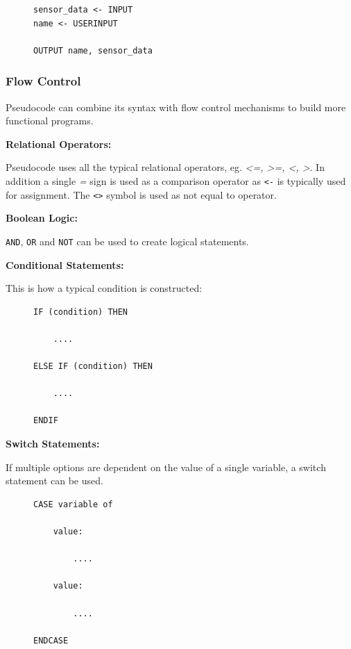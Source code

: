 \documentclass[9pt]{article}
\begin{document}
\begin{figure}[H]
\begin{verbatim}
sensor_data <- INPUT
name <- USERINPUT

OUTPUT name, sensor_data
\end{verbatim}
\end{figure}

\subsubsection{Flow Control}
\label{sec:org4c26a6b}

Pseudocode can combine its syntax with flow control mechanisms to build more functional programs.

\textbf{Relational Operators:}

Pseudocode uses all the typical relational operators, eg. \emph{<=, >=, <, >}. In addition a single \emph{=} sign is used as a comparison operator as \texttt{<-} is typically used for assignment. The \texttt{<>} symbol is used as not equal to operator.

\textbf{Boolean Logic:}

\texttt{AND}, \texttt{OR} and \texttt{NOT} can be used to create logical statements.

\textbf{Conditional Statements:}

This is how a typical condition is constructed:

\begin{figure}[H]
\begin{verbatim}
IF (condition) THEN

    ....

ELSE IF (condition) THEN

    ....

ENDIF
\end{verbatim}
\end{figure}

\textbf{Switch Statements:}

If multiple options are dependent on the value of a single variable, a switch statement can be used.

\begin{figure}[H]
\begin{verbatim}
CASE variable of

    value:

        ....

    value:

        ....

ENDCASE
\end{verbatim}
\end{figure}
\end{document}
